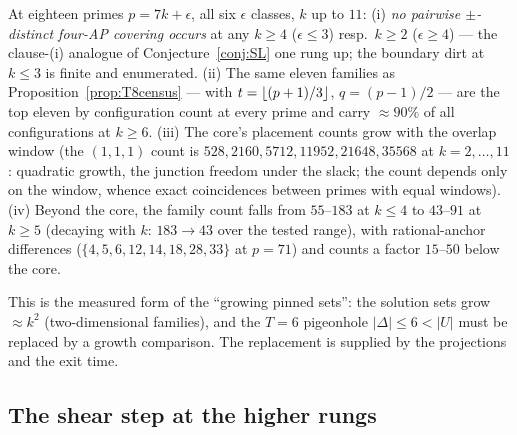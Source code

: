 \begin{proposition}[the $T=7$ census; machine]\label{prop:T7census}
At eighteen primes $p=7k+\epsilon$, all six $\epsilon$ classes, $k$ up
to $11$: (i) \emph{no pairwise $\pm$-distinct four-AP covering occurs}
at any $k\ge4$ ($\epsilon\le3$) resp.\ $k\ge2$ ($\epsilon\ge4$) --- the
clause-(i) analogue of Conjecture~\ref{conj:SL} one rung up; the
boundary dirt at $k\le3$ is finite and enumerated. (ii) The same eleven
families as Proposition~\ref{prop:T8census} --- with
$t=\left\lfloor (p+1)/3 \right\rfloor$, $q=(p-1)/2$ --- are the top eleven by
configuration count at every prime and carry $\approx90\%$ of all
configurations at $k\ge6$. (iii) The core's placement counts grow with
the overlap window (the $(1,1,1)$ count is
$528,2160,5712,11952,21648,35568$ at $k=2,\dots,11$: quadratic growth,
the junction freedom under the slack; the count depends only on the
window, whence exact coincidences between primes with equal windows).
(iv) Beyond the core, the family count falls from $55$--$183$ at
$k\le4$ to $43$--$91$ at $k\ge5$ (decaying with $k$: $183\to43$ over
the tested range), with rational-anchor differences
($\{4,5,6,12,14,18,28,33\}$ at $p=71$) and counts a factor $15$--$50$
below the core.
\end{proposition}

This is the measured form of the ``growing pinned sets'': the solution
sets grow $\approx k^2$ (two-dimensional families), and the $T=6$
pigeonhole $|\Delta|\le6<|U|$ must be replaced by a growth comparison.
The replacement is supplied by the projections and the exit time.

\subsection{The shear step at the higher rungs}

